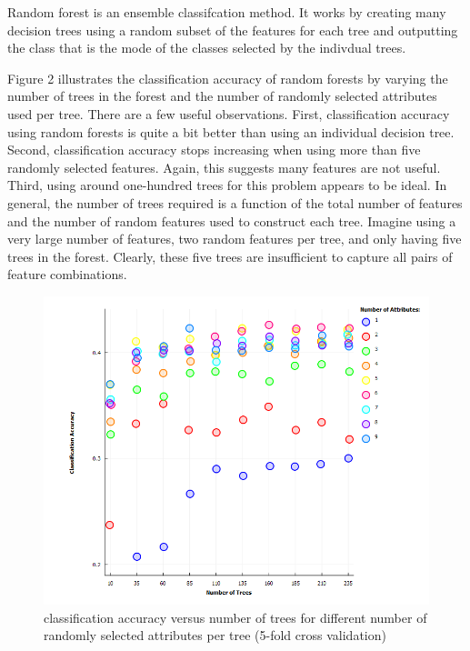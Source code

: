 \documentclass{article} %
\begin{document}
Random forest is an ensemble classifcation method. It works by creating many decision trees using a random subset of the features for each tree and outputting the class that is the mode of the classes selected by the indivdual trees. 

Figure 2 illustrates the classification accuracy of random forests by varying the number of trees in the forest and the number of randomly selected attributes used per tree. There are a few useful observations. First, classification accuracy using random forests is quite a bit better than using an individual decision tree. Second, classification accuracy stops increasing when using more than five randomly selected features. Again, this suggests many features are not useful. Third, using around one-hundred trees for this problem appears to be ideal. In general, the number of trees required is a function of the total number of features and the number of random features used to construct each tree. Imagine using a very large number of features, two random features per tree, and only having five trees in the forest. Clearly, these five trees are insufficient to capture all pairs of feature combinations. 

\begin{figure}
\vspace*{-.5in}
\hspace*{-.6in}
\includegraphics[width=174mm]{random_forests.png}
\caption{classification accuracy versus number of trees for different number of randomly selected attributes per tree (5-fold cross validation) }
\end{figure}
\end{document}

